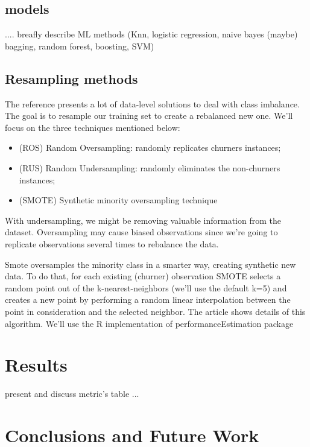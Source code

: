 \documentclass[12pt,letterpaper]{article}
\begin{document}
	\subsection{models}
	.... breafly describe ML methods (Knn, logistic regression, naive bayes (maybe) bagging, random forest, boosting, SVM) 
	
	\subsection{Resampling methods}
	The reference\cite{class_imbalance} presents a lot of data-level solutions to deal with class imbalance. The goal is to resample our training set to create a rebalanced new one. We'll focus on the three techniques mentioned below:
	
	\begin{itemize}
		\item (ROS) Random Oversampling: randomly replicates churners instances;
		\item (RUS) Random Undersampling: randomly eliminates the non-churners instances;
		\item (SMOTE) Synthetic minority oversampling technique\cite{smote}
	\end{itemize}
	
	With undersampling, we might be removing valuable information from the dataset. Oversampling may cause biased observations since we're going to replicate observations several times to rebalance the data. 
	
	Smote oversamples the minority class in a smarter way, creating synthetic new data. To do that, for each existing (churner) observation SMOTE selects a random point out of the k-nearest-neighbors (we'll use the default k=5) and creates a new point by performing a random linear interpolation between the point in consideration and the selected neighbor. The article \cite{smote} shows details of this algorithm. We'll use the R implementation of performanceEstimation package\cite{performanceestimation}
	
	\section{Results}
	present and discuss metric's table ...
	
	\section{Conclusions and Future Work}
	\newpage
	\printbibliography
\end{document}
